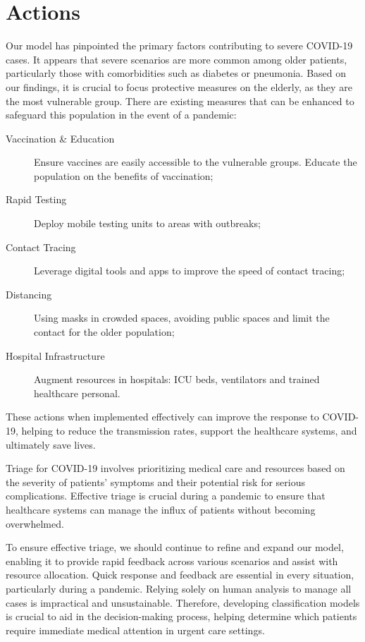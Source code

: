 \section{Actions}

Our model has pinpointed the primary factors contributing to severe 
COVID-19 cases. It appears that severe scenarios are more common among 
older patients, particularly those with comorbidities such as diabetes 
or pneumonia. Based on our findings, it is crucial to focus protective 
measures on the elderly, as they are the most vulnerable group. There
are existing measures that can be enhanced to safeguard this 
population in the event of a pandemic:
\begin{description}
    \item [Vaccination \& Education] Ensure vaccines are easily
    accessible to the vulnerable groups. Educate the population on the
    benefits of vaccination;
    \item[Rapid Testing] Deploy mobile testing units to areas with 
    outbreaks;
    \item[Contact Tracing] Leverage digital tools and apps to improve
    the speed of contact tracing;
    \item[Distancing] Using masks in crowded spaces, avoiding public
    spaces and limit the contact for the older population;
    \item[Hospital Infrastructure] Augment resources in hospitals: ICU
    beds, ventilators and trained healthcare personal.
\end{description}

These actions when implemented effectively can improve the response
to COVID-19, helping to reduce the transmission rates, support the 
healthcare systems, and ultimately save lives.

Triage for COVID-19 involves prioritizing medical care and resources 
based on the severity of patients' symptoms and their potential 
risk for serious complications. Effective triage is crucial during a 
pandemic to ensure that healthcare systems can manage the influx of 
patients without becoming overwhelmed. 

To ensure effective triage, we should continue to refine and expand our
model, enabling it to provide rapid feedback across various scenarios
and assist with resource allocation. Quick response and feedback are 
essential in every situation, particularly during a pandemic. Relying 
solely on human analysis to manage all cases is impractical and 
unsustainable. Therefore, developing classification models is crucial 
to aid in the decision-making process, helping determine which 
patients require immediate medical attention in urgent care settings.
